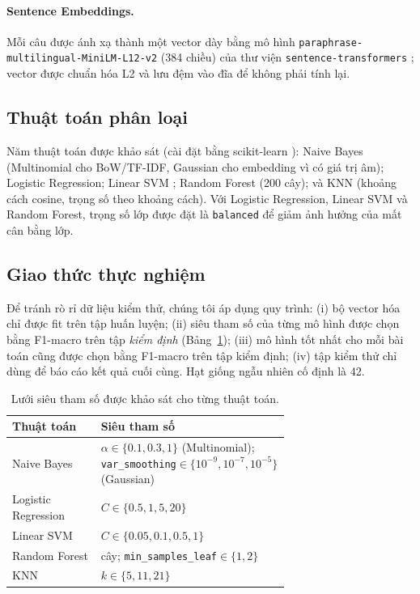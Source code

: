 \documentclass[12pt,a4paper]{article}
\begin{document}
\paragraph{Sentence Embeddings.} Mỗi câu được ánh xạ thành một vector dày bằng mô hình \texttt{paraphrase-\allowbreak multilingual-\allowbreak MiniLM-\allowbreak L12-\allowbreak v2} (384 chiều) của thư viện \texttt{sentence-transformers} \cite{reimers2019sbert,reimers2020multilingual};
vector được chuẩn hóa L2 và lưu đệm vào đĩa để không phải tính lại.

\subsection{Thuật toán phân loại}
Năm thuật toán được khảo sát (cài đặt bằng scikit-learn \cite{pedregosa2011sklearn}):
Naive Bayes (Multinomial cho BoW/TF-IDF, Gaussian cho embedding vì có giá trị âm);
Logistic Regression;
Linear SVM \cite{cortes1995svm,fan2008liblinear};
Random Forest \cite{breiman2001rf} (200 cây);
và KNN (khoảng cách cosine, trọng số theo khoảng cách).
Với Logistic Regression, Linear SVM và Random Forest, trọng số lớp được đặt là \texttt{balanced} để giảm ảnh hưởng của mất cân bằng lớp.

\subsection{Giao thức thực nghiệm}
Để tránh rò rỉ dữ liệu kiểm thử, chúng tôi áp dụng quy trình:
(i) bộ vector hóa chỉ được fit trên tập huấn luyện;
(ii) siêu tham số của từng mô hình được chọn bằng F1-macro trên tập \emph{kiểm định} (Bảng~\ref{tab:grid});
(iii) mô hình tốt nhất cho mỗi bài toán cũng được chọn bằng F1-macro trên tập kiểm định;
(iv) tập kiểm thử chỉ dùng để báo cáo kết quả cuối cùng. Hạt giống ngẫu nhiên cố định là 42.

\begin{table}[htbp]
\centering\small
\caption{Lưới siêu tham số được khảo sát cho từng thuật toán.}\label{tab:grid}
\begin{tabular}{l>{\raggedright\arraybackslash}p{0.68\linewidth}}
\toprule
Thuật toán & Siêu tham số \\
\midrule
Naive Bayes & $\alpha\in\{0.1,0.3,1\}$ (Multinomial); \texttt{var\_smoothing}$\in\{10^{-9},10^{-7},10^{-5}\}$ (Gaussian) \\
Logistic Regression & $C\in\{0.5,1,5,20\}$ \\
Linear SVM & $C\in\{0.05,0.1,0.5,1\}$ \\
Random Forest & 200 cây; \texttt{min\_samples\_leaf}$\in\{1,2\}$ \\
KNN & $k\in\{5,11,21\}$ \\
\bottomrule
\end{tabular}
\end{table}
\end{document}
